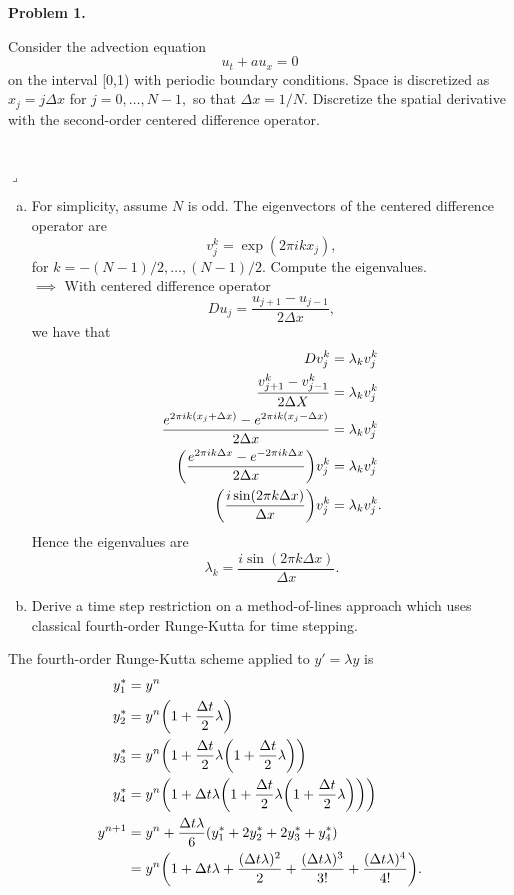 \documentclass[12pt]{article}
\newenvironment{myprob}[1]
    {%
    \noindent{\Huge$\ulcorner$}\textbf{#1.}\begin{em}
    }
    { 
    \end{em} \\ \hphantom{l} \hfill {\Huge$\lrcorner$} }
\begin{document}
\rhead{\today}

{\let\newpage\relax} 


\begin{myprob}{Problem 1}
Consider the advection equation
$$u_t + au_x = 0 $$
on the interval [0,1) with periodic boundary conditions. Space is discretized as $x_j = j \Delta x$ for $j=0, \dots, N-1,$ so that $\Delta x = 1/N$.  Discretize the spatial derivative with the second-order centered difference operator.
\end{myprob}
\begin{enumerate}[(a)]
\item For simplicity, assume $N$ is odd.  The eigenvectors of the centered difference operator are 
$$v_j^k = \exp(2\pi i k x_j),$$
for $k=-(N-1)/2, \dots, (N-1)/2$.  Compute the eigenvalues. \\

$\implies$ With centered difference operator
  $$D u_j = \dfrac{u_{j+1} - u_{j-1}}{2\Delta x},$$
  we have that 
  \begin{align*}
  D v_j^k &= \lambda_k v_j^k \\
  \dfrac{v^k_{j+1}- v^k_{j-1}}{2\Delta X} &= \lambda_k v_j^k\\
  \dfrac{e^{2\pi i k (x_j+\Delta x)}- e^{2 \pi i k (x_j - \Delta x)}}{2\Delta x} &= \lambda_k v_j^k \\
 \qty( \dfrac{e^{2\pi i k \Delta x}- e^{-2 \pi i k \Delta x}}{2\Delta x }) v_j^k &= \lambda_k v_j^k \\
 \qty(\dfrac{i \sin(2\pi k \Delta x)}{\Delta x})v_j^k &= \lambda_k v_j^k.
  \end{align*}
 Hence the eigenvalues are $$\lambda_k = \dfrac{i \sin(2 \pi k \Delta x)}{\Delta x}.$$

\item Derive a time step restriction on a method-of-lines approach which uses classical fourth-order Runge-Kutta for time stepping.
\end{enumerate}
The fourth-order Runge-Kutta scheme applied to $y' = \lambda y$ is
\begin{align*}
y_1^* &= y^n \\
y_2^* &= y^n\qty(1 + \dfrac{\Delta t}{2} \lambda) \\
y_3^* &= y^n\qty(1 + \dfrac{\Delta t}{2} \lambda\qty(1 + \dfrac{\Delta t}{2} \lambda)) \\
y_4^* &= y^n\qty(1 + \Delta t \lambda\qty(1 + \dfrac{\Delta t}{2} \lambda\qty(1 + \dfrac{\Delta t}{2} \lambda))) \\
y^{n+1} &= y^n + \dfrac{\Delta t \lambda}{6}\qty(y_1^* + 2y_2^* +2y_3^*+y_4^*)\\
&= y^n\qty(1 + \Delta t \lambda + \dfrac{(\Delta t\lambda)^2}{2}+\dfrac{(\Delta t\lambda)^3}{3!}+\dfrac{(\Delta t \lambda)^4}{4!}).
\end{align*}
\end{document}
